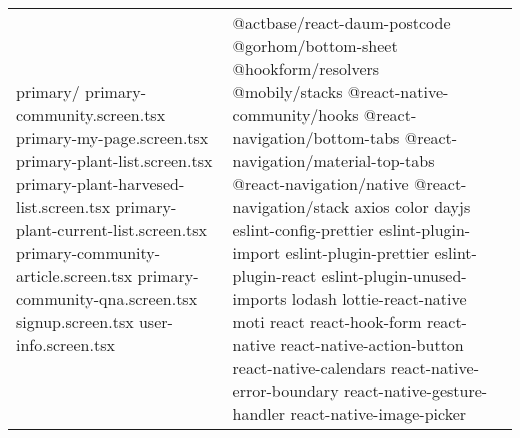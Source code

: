 \documentclass[conference, a4paper]{IEEEtran}
\begin{document}
\begin{table} [htp]
\begin{tabular}{p{1.7cm}|p{2.8cm}|p{2.5cm}}
 \newline primary/ \newline primary-community.screen.tsx \newline primary-my-page.screen.tsx
 \newline primary-plant-list.screen.tsx \newline primary-plant-harvesed-list.screen.tsx \newline primary-plant-current-list.screen.tsx \newline primary-community-article.screen.tsx \newline primary-community-qna.screen.tsx \newline signup.screen.tsx \newline user-info.screen.tsx & @actbase/react-daum-postcode
 \newline @gorhom/bottom-sheet \newline @hookform/resolvers \newline @mobily/stacks \newline @react-native-community/hooks \newline @react-navigation/bottom-tabs \newline @react-navigation/material-top-tabs \newline @react-navigation/native \newline @react-navigation/stack \newline axios \newline color \newline dayjs \newline eslint-config-prettier \newline eslint-plugin-import \newline eslint-plugin-prettier \newline eslint-plugin-react \newline eslint-plugin-unused-imports \newline lodash \newline lottie-react-native \newline moti \newline react \newline react-hook-form \newline react-native \newline react-native-action-button \newline react-native-calendars \newline react-native-error-boundary \newline react-native-gesture-handler \newline react-native-image-picker \newline 
\end{tabular}
\end{table}
\end{document}
